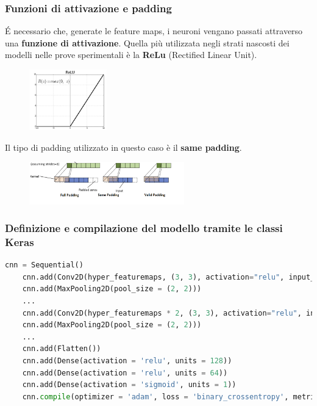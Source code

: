 \documentclass{beamer}
\begin{document}
\begin{frame}
	\frametitle{Funzioni di attivazione e padding}
	É necessario che, generate le feature maps, i 
neuroni vengano passati attraverso una \textbf{funzione di attivazione}. 
Quella più utilizzata negli strati nascosti dei modelli nelle prove sperimentali è la \textbf{ReLu}
 (Rectified Linear Unit).
	\begin{figure}
		\includegraphics[width=0.3\textwidth]{relu.png}
	\end{figure}
Il tipo di padding utilizzato in questo caso è il \textbf{same padding}.
\begin{figure}
	\includegraphics[width=0.6\textwidth]{padding.PNG}
\end{figure}

	
\end{frame}



\begin{frame}[fragile]
	\frametitle{Definizione e compilazione del modello tramite le classi Keras}

\begin{lstlisting}[basicstyle=\tiny, language=Python, numbers = none]
	cnn = Sequential()
	cnn.add(Conv2D(hyper_featuremaps, (3, 3), activation="relu", input_shape=(img_width, img_height, hyper_channels)))
	cnn.add(MaxPooling2D(pool_size = (2, 2)))
	...
	cnn.add(Conv2D(hyper_featuremaps * 2, (3, 3), activation="relu", input_shape=(img_width, img_height, hyper_channels)))
	cnn.add(MaxPooling2D(pool_size = (2, 2)))
	...
	cnn.add(Flatten())
	cnn.add(Dense(activation = 'relu', units = 128))
	cnn.add(Dense(activation = 'relu', units = 64))
	cnn.add(Dense(activation = 'sigmoid', units = 1))
	cnn.compile(optimizer = 'adam', loss = 'binary_crossentropy', metrics = ['accuracy'])
\end{lstlisting}
\end{frame}
\end{document}
